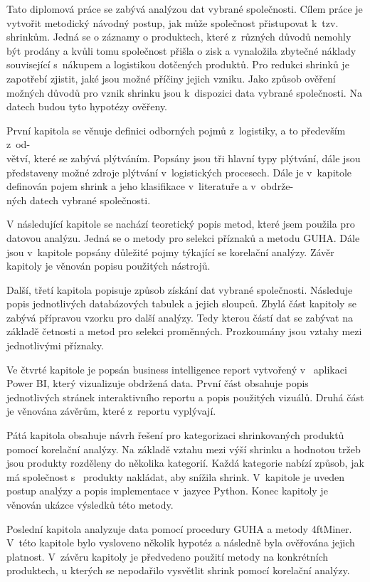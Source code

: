 Tato diplomová práce se zabývá analýzou dat vybrané společnosti. Cílem práce je vytvořit metodický návodný postup, jak může společnost přistupovat k~tzv. shrinkům.
Jedná se o záznamy o produktech, které z~různých důvodů nemohly být prodány a kvůli tomu společnost přišla o zisk a vynaložila zbytečné náklady související s~nákupem a logistikou dotčených produktů. 
Pro redukci shrinků je zapotřebí zjistit, jaké jsou možné příčiny jejich vzniku.
Jako způsob ověření možných důvodů pro vznik shrinku jsou k~dispozici data vybrané společnosti. Na datech budou tyto hypotézy ověřeny. 

První kapitola se věnuje definici odborných pojmů z~logistiky, a to především z~od-\\větví, které se zabývá plýtváním. Popsány jsou tři hlavní typy plýtvání, dále jsou představeny možné zdroje plýtvání v~logistických procesech. Dále je v~kapitole definován pojem shrink a jeho klasifikace v~literatuře a v~obdrže-\\ných datech vybrané společnosti.


V následující kapitole se nachází teoretický popis metod, které jsem použila pro datovou analýzu. Jedná se o metody pro selekci příznaků a metodu GUHA. Dále jsou v~kapitole popsány důležité pojmy týkající se korelační analýzy. Závěr kapitoly je věnován popisu použitých nástrojů.

Další, třetí kapitola popisuje způsob získání dat vybrané společnosti. Následuje popis jednotlivých databázových tabulek a jejich sloupců. Zbylá část kapitoly se zabývá přípravou vzorku pro další analýzy. Tedy kterou částí dat se zabývat na základě četnosti a metod pro selekci proměnných. Prozkoumány jsou vztahy mezi jednotlivými příznaky.

Ve čtvrté kapitole je popsán business intelligence report vytvořený v~ aplikaci Power BI, který vizualizuje obdržená data. První část obsahuje popis jednotlivých stránek interaktivního reportu a popis použitých vizuálů. Druhá část je věnována závěrům, které z~reportu vyplývají.

Pátá kapitola obsahuje návrh řešení pro kategorizaci shrinkovaných produktů pomocí korelační analýzy. Na základě vztahu mezi výší shrinku a hodnotou tržeb jsou produkty rozděleny do několika kategorií. Každá kategorie nabízí způsob, jak má společnost s~ produkty nakládat, aby snížila shrink. V~kapitole je uveden postup analýzy a popis implementace v~jazyce Python. Konec kapitoly je věnován ukázce výsledků této metody.

Poslední kapitola analyzuje data pomocí procedury GUHA a metody 4ftMiner. V~této kapitole bylo vysloveno několik hypotéz a následně byla ověřována jejich platnost. V~závěru kapitoly je předvedeno použití metody na konkrétních produktech, u kterých se nepodařilo vysvětlit shrink pomocí korelační analýzy.


